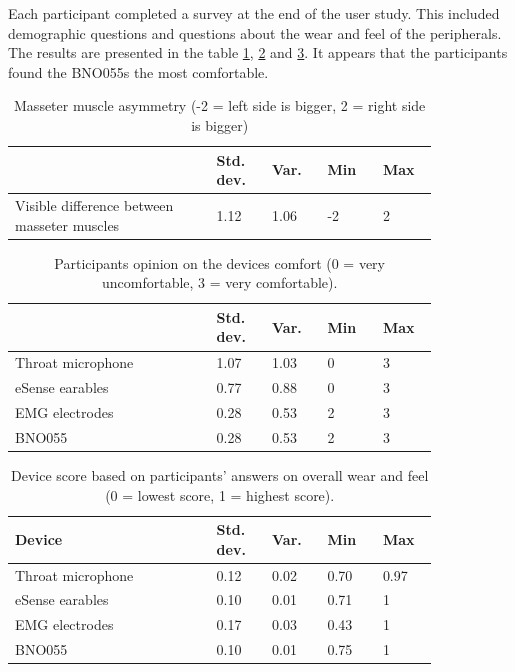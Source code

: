 Each participant completed a survey at the end of the user study. This included demographic questions and questions about the wear and feel of the peripherals. The results are presented in the table \ref{table:masseter_asymmetry}, \ref{table:devices_comfort} and \ref{table:devices_score}. It appears that the participants found the BNO055s the most comfortable.

\begin{table}[!h]
\centering
\begin{tabular}{|>{\raggedright}m{0.4\linewidth}||m{0.11\linewidth}|m{0.11\linewidth}|m{0.11\linewidth}|m{0.11\linewidth}|} 
 \hline
  & Std. dev. & Var. & Min & Max \\ [0.5ex] 
 \hline\hline
 Visible difference between masseter muscles & 1.12 & 1.06 & -2 & 2 \\
 \hline
\end{tabular}
\caption{Masseter muscle asymmetry (-2 = left side is bigger, 2 = right side is bigger)}
\label{table:masseter_asymmetry}
\end{table}

\begin{table}[!h]
\centering
\begin{tabular}{|>{\raggedright}m{0.4\linewidth}||m{0.11\linewidth}|m{0.11\linewidth}|m{0.11\linewidth}|m{0.11\linewidth}|} 
 \hline
  & Std. dev. & Var. & Min & Max \\ [0.5ex] 
 \hline\hline
 Throat microphone & 1.07 & 1.03 & 0 & 3 \\
 \hline
 eSense earables & 0.77 & 0.88 & 0 & 3 \\
 \hline
 EMG electrodes & 0.28 & 0.53 & 2 & 3 \\
 \hline
 BNO055 & 0.28 & 0.53 & 2 & 3 \\
 \hline
\end{tabular}
\caption{Participants opinion on the devices comfort (0 = very uncomfortable, 3 = very comfortable).}
\label{table:devices_comfort}
\end{table}

\begin{table}[!h]
\centering
\begin{tabular}{|>{\raggedright}m{0.4\linewidth}||m{0.11\linewidth}|m{0.11\linewidth}|m{0.11\linewidth}|m{0.11\linewidth}|} 
 \hline
  Device & Std. dev. & Var. & Min & Max \\ [0.5ex] 
 \hline\hline
 Throat microphone & 0.12 & 0.02 & 0.70 & 0.97 \\
 \hline
 eSense earables & 0.10 & 0.01 & 0.71 & 1 \\
 \hline
 EMG electrodes & 0.17 & 0.03 & 0.43 & 1 \\
 \hline
 BNO055 & 0.10 & 0.01 & 0.75 & 1 \\
 \hline
\end{tabular}
\caption{Device score based on participants' answers on overall wear and feel (0 = lowest score, 1 = highest score).}
\label{table:devices_score}
\end{table}

